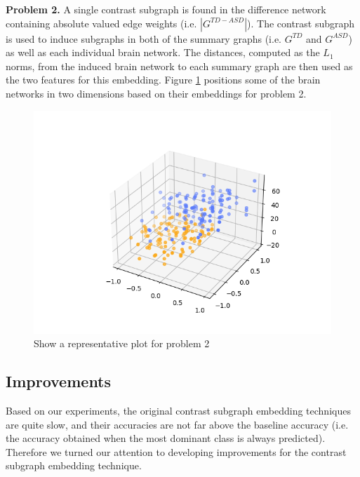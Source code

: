 \documentclass[sigconf]{acmart}
\begin{document}
\textbf{Problem 2.}
A single contrast subgraph is found in the difference network containing absolute valued edge weights (i.e. $|G^{TD - ASD}|$).
The contrast subgraph is used to induce subgraphs in both of the summary graphs (i.e. $G^{TD}$ and $G^{ASD}$) as well as each individual brain network.
The distances, computed as the $L_1$ norms, from the induced brain network to each summary graph are then used as the two features for this embedding.
Figure \ref{fig:prob2} positions some of the brain networks in two dimensions based on their embeddings for problem 2. 

\begin{figure}
    \centering
    \includegraphics[width=\columnwidth, keepaspectratio=true]{test.png}
    \caption{Show a representative plot for problem 2}
    \label{fig:prob2}
\end{figure}




\subsection{Improvements} \label{improvements}

Based on our experiments, the original contrast subgraph embedding techniques are quite slow, and their accuracies are not far above the baseline accuracy (i.e. the accuracy obtained when the most dominant class is always predicted).
Therefore we turned our attention to developing improvements for the contrast subgraph embedding technique.
\end{document}
